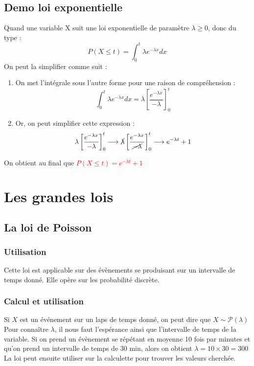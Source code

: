 \documentclass{article}
\begin{document}
\subsection{Demo loi exponentielle}
Quand une variable X suit une loi exponentielle de paramètre $\lambda \geqslant 0$, donc du type : 
\begin{equation*}
    P(X \leqslant t) = \int_0^t \lambda e^{-\lambda x} dx
\end{equation*}
On peut la simplifier comme suit : 
\begin{enumerate}
    \item On met l'intégrale sous l'autre forme pour une raison de compréhension : 
    \begin{equation*}
        \int_0^t \lambda e^{-\lambda x} dx = \lambda \left [ \frac{e^{-\lambda x}}{-\lambda} \right ]_0^t
    \end{equation*}
    \item Or, on peut simplifier cette expression : 
    \begin{equation*}
        \lambda \left [ \frac{e^{-\lambda x}}{-\lambda} \right ]_0^t \longrightarrow \cancel{\lambda} \left [ \frac{e^{-\lambda x}}{\cancel{-\lambda}} \right ]_0^t \longrightarrow e^{-\lambda t} + 1
    \end{equation*}
    
\end{enumerate}

On obtient au final que \textcolor{red}{$P(X \leqslant t) = e^{-\lambda t} + 1$}
\newpage

\section{Les grandes lois}
\subsection{La loi de Poisson}
\subsubsection{Utilisation}
Cette loi est applicable sur des évènements se produisant sur un intervalle de temps donné. Elle opère sur les probabilité discrète.

\subsubsection{Calcul et utilisation}
Si $X$ est un événement sur un laps de temps donné, on peut dire que $X \sim \mathcal{P}(\lambda)$
Pour connaître $\lambda$, il nous faut l'espérance ainsi que l'intervalle de temps de la variable. Si on prend un évènement se répétant en moyenne 10 fois par minutes et qu'on prend un intervalle de temps de 30 min, alors on obtient $\lambda = 10 \times 30 = 300$\newline
La loi peut ensuite utiliser sur la calculette pour trouver les valeurs cherchée.
\end{document}
